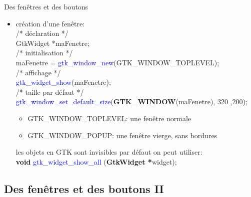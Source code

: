 \documentclass{beamer}
\begin{document}
\begin{frame}{Des fenêtres et des boutons}
    \begin{itemize}
    \item création d'une fenêtre:\\
    \hspace{0.5cm}\textcolor{brun}{/* déclaration */}\\
    \hspace{0.5cm}GtkWidget *maFenetre;\\
    \hspace{0.5cm}\textcolor{brun}{/* initialisation */}\\
    \hspace{0.5cm}maFenetre = \textcolor{blue}{gtk\_window\_new}(GTK\_WINDOW\_TOPLEVEL);\\
    \hspace{0.5cm}\textcolor{brun}{/* affichage */}\\
    \hspace{0.5cm}\textcolor{blue}{gtk\_widget\_show}(maFenetre);\\
    \hspace{0.5cm}\textcolor{brun}{/* taille par défaut */}\\
    \hspace{0.5cm}\textcolor{blue}{gtk\_window\_set\_default\_size}(\textbf{GTK\_WINDOW}(maFenetre), 320 ,200);\\
    \vspace{0.2cm}
    \begin{itemize}
        \item GTK\_WINDOW\_TOPLEVEL: une fenêtre normale
        \item GTK\_WINDOW\_POPUP: une fenêtre vierge, sans bordures
    \end{itemize}
    les objets en GTK sont invisibles par défaut on peut utiliser:\\
    \hspace{0.5cm}\textbf{void} \textcolor{blue}{gtk\_widget\_show\_all} (\textbf{GtkWidget *}widget); 
    \end{itemize}
\end{frame}

\subsection{Des fenêtres et des boutons II}
\end{document}
